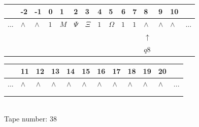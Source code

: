 \documentclass[11pt]{article}
\begin{document}
\begin{table}[H]
\centering
\begin{tabular}{lllllllllllllll}
 & -2 & -1 & 0 & 1 & 2 & 3 & 4 & 5 & 6 & 7 & 8 & 9 & 10 & \\
\hline
$...$ & \multicolumn{1}{|l|}{$\wedge$} & \multicolumn{1}{|l|}{$\wedge$} & \multicolumn{1}{|l|}{$1$} & \multicolumn{1}{|l|}{$M$} & \multicolumn{1}{|l|}{$\Psi$} & \multicolumn{1}{|l|}{$\Xi$} & \multicolumn{1}{|l|}{$1$} & \multicolumn{1}{|l|}{$\Omega$} & \multicolumn{1}{|l|}{$1$} & \multicolumn{1}{|l|}{$1$} & \multicolumn{1}{|l|}{$\wedge$} & \multicolumn{1}{|l|}{$\wedge$} & \multicolumn{1}{|l|}{$\wedge$} & $...$\\
\hline
&  &  &  &  &  &  &  &  &  &  & $\uparrow$ &  &  &  \\
&  &  &  &  &  &  &  &  &  &  & $ q8 $ &  &  &  \\
\end{tabular}
\begin{tabular}{llllllllllll}
 & 11 & 12 & 13 & 14 & 15 & 16 & 17 & 18 & 19 & 20 & \\
\hline
$...$ & \multicolumn{1}{|l|}{$\wedge$} & \multicolumn{1}{|l|}{$\wedge$} & \multicolumn{1}{|l|}{$\wedge$} & \multicolumn{1}{|l|}{$\wedge$} & \multicolumn{1}{|l|}{$\wedge$} & \multicolumn{1}{|l|}{$\wedge$} & \multicolumn{1}{|l|}{$\wedge$} & \multicolumn{1}{|l|}{$\wedge$} & \multicolumn{1}{|l|}{$\wedge$} & \multicolumn{1}{|l|}{$\wedge$} & $...$\\
\hline
&  &  &  &  &  &  &  &  &  &  &  \\
&  &  &  &  &  &  &  &  &  &  &  \\
\end{tabular}
\\
Tape number: 38
\noindent\makebox[\linewidth]{\hdashrule{\textwidth}{1pt}{1pt}}\end{table}
\end{document}
